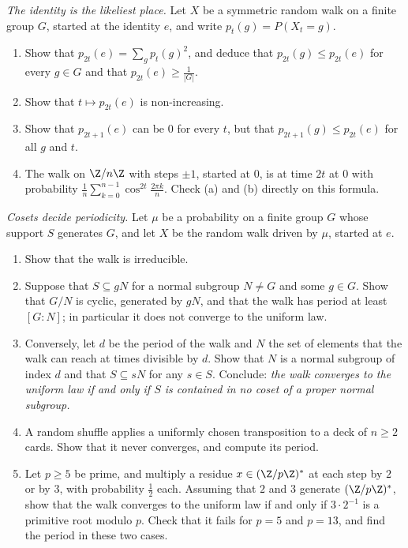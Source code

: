 \begin{exercise}[$\star\star$]\label{pb:returnbound}
\emph{The identity is the likeliest place.} Let $X$ be a symmetric random walk on a finite group $G$, started at the identity $e$,
and write $p_t(g)=P(X_t=g)$.
\begin{enumerate}[label=(\alph*)]
\item Show that $p_{2t}(e)=\sum_{g}p_t(g)^2$, and deduce that $p_{2t}(g)\le p_{2t}(e)$ for every $g\in G$ and that $p_{2t}(e)\ge\frac1{|G|}$.
\item Show that $t\mapsto p_{2t}(e)$ is non-increasing.
\item Show that $p_{2t+1}(e)$ can be $0$ for every $t$, but that $p_{2t+1}(g)\le p_{2t}(e)$ for all $g$ and $t$.
\item The walk on $\Z/n\Z$ with steps $\pm1$, started at $0$, is at time $2t$ at $0$ with probability $\frac1n\sum_{k=0}^{n-1}\cos^{2t}\frac{2\pi k}n$. Check (a) and
(b) directly on this formula.
\end{enumerate}
\end{exercise}

\begin{exercise}[$\star\star\star$]\label{pb:period}
\emph{Cosets decide periodicity.} Let $\mu$ be a probability on a finite group $G$ whose support $S$ generates $G$, and let $X$ be the
random walk driven by $\mu$, started at $e$.
\begin{enumerate}[label=(\alph*)]
\item Show that the walk is irreducible.
\item Suppose that $S\subseteq gN$ for a normal subgroup $N\ne G$ and some $g\in G$. Show that $G/N$ is cyclic, generated by $gN$, and that the
walk has period at least $[G:N]$; in particular it does not converge to the uniform law.
\item Conversely, let $d$ be the period of the walk and $N$ the set of elements that the walk can reach at times divisible by
$d$. Show that $N$ is a normal subgroup of index $d$ and that $S\subseteq sN$ for any $s\in S$. Conclude: \emph{the walk converges to the
uniform law if and only if $S$ is contained in no coset of a proper normal subgroup.}
\item A random shuffle applies a uniformly chosen transposition to a deck of $n\ge2$ cards. Show that it never converges, and
compute its period.
\item Let $p\ge5$ be prime, and multiply a residue $x\in(\Z/p\Z)^*$ at each step by $2$ or by $3$, with probability $\frac12$ each. Assuming
that $2$ and $3$ generate $(\Z/p\Z)^*$, show that the walk converges to the uniform law if and only if $3\cdot2^{-1}$ is a primitive root
modulo $p$. Check that it fails for $p=5$ and $p=13$, and find the period in these two cases.
\end{enumerate}
\end{exercise}

